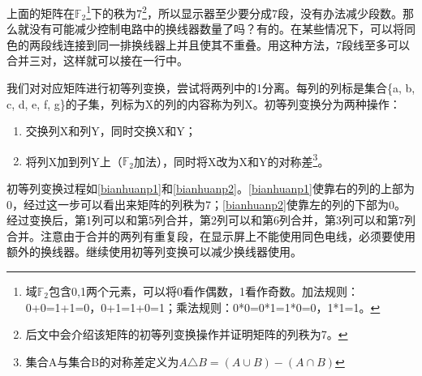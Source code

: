 上面的矩阵在$\mathbb{F}_2$\footnote{域$\mathbb{F}_2$包含0,1两个元素，可以将0看作偶数，1看作奇数。加法规则：0+0=1+1=0，0+1=1+0=1；乘法规则：0*0=0*1=1*0=0，1*1=1。}下的秩为7\footnote{后文中会介绍该矩阵的初等列变换操作并证明矩阵的列秩为7。}，所以显示器至少要分成7段，没有办法减少段数。那么就没有可能减少控制电路中的换线器数量了吗？有的。在某些情况下，可以将同色的两段线连接到同一排换线器上并且使其不重叠。用这种方法，7段线至多可以合并三对，这样就可以接在一行中。

我们对对应矩阵进行初等列变换，尝试将两列中的1分离。每列的列标是集合\{a, b, c, d, e, f, g\}的子集，列标为X的列的内容称为列X。初等列变换分为两种操作：
\begin{enumerate}
  \item 交换列X和列Y，同时交换X和Y；
  \item 将列X加到列Y上（$\mathbb{F}_2$加法），同时将X改为X和Y的对称差\footnote{集合A与集合B的对称差定义为$A\triangle B=(A\cup B)-(A\cap B)$}。
\end{enumerate}

初等列变换过程如\autoref{bianhuanp1}和\autoref{bianhuanp2}。\autoref{bianhuanp1}使靠右的列的上部为0，经过这一步可以看出来矩阵的列秩为7；\autoref{bianhuanp2}使靠左的列的下部为0。经过变换后，第1列可以和第5列合并，第2列可以和第6列合并，第3列可以和第7列合并。注意由于合并的两列有重复段，在显示屏上不能使用同色电线，必须要使用额外的换线器。继续使用初等列变换可以减少换线器使用。

